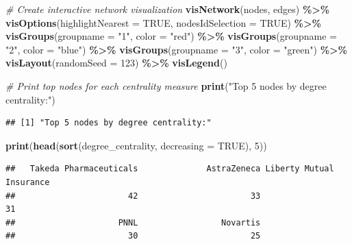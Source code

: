\documentclass[
]{article}
\newenvironment{Shaded}{\begin{snugshade}}{\end{snugshade}}
\newcommand{\AttributeTok}[1]{\textcolor[rgb]{0.13,0.29,0.53}{#1}}
\newcommand{\CommentTok}[1]{\textcolor[rgb]{0.56,0.35,0.01}{\textit{#1}}}
\newcommand{\ConstantTok}[1]{\textcolor[rgb]{0.56,0.35,0.01}{#1}}
\newcommand{\DecValTok}[1]{\textcolor[rgb]{0.00,0.00,0.81}{#1}}
\newcommand{\FunctionTok}[1]{\textcolor[rgb]{0.13,0.29,0.53}{\textbf{#1}}}
\newcommand{\NormalTok}[1]{#1}
\newcommand{\SpecialCharTok}[1]{\textcolor[rgb]{0.81,0.36,0.00}{\textbf{#1}}}
\newcommand{\StringTok}[1]{\textcolor[rgb]{0.31,0.60,0.02}{#1}}
\begin{document}
\begin{Shaded}
\begin{Highlighting}[]
\CommentTok{\# Create interactive network visualization}
\FunctionTok{visNetwork}\NormalTok{(nodes, edges) }\SpecialCharTok{\%\textgreater{}\%}
  \FunctionTok{visOptions}\NormalTok{(}\AttributeTok{highlightNearest =} \ConstantTok{TRUE}\NormalTok{, }\AttributeTok{nodesIdSelection =} \ConstantTok{TRUE}\NormalTok{) }\SpecialCharTok{\%\textgreater{}\%}
  \FunctionTok{visGroups}\NormalTok{(}\AttributeTok{groupname =} \StringTok{"1"}\NormalTok{, }\AttributeTok{color =} \StringTok{"red"}\NormalTok{) }\SpecialCharTok{\%\textgreater{}\%}
  \FunctionTok{visGroups}\NormalTok{(}\AttributeTok{groupname =} \StringTok{"2"}\NormalTok{, }\AttributeTok{color =} \StringTok{"blue"}\NormalTok{) }\SpecialCharTok{\%\textgreater{}\%}
  \FunctionTok{visGroups}\NormalTok{(}\AttributeTok{groupname =} \StringTok{"3"}\NormalTok{, }\AttributeTok{color =} \StringTok{"green"}\NormalTok{) }\SpecialCharTok{\%\textgreater{}\%}
  \FunctionTok{visLayout}\NormalTok{(}\AttributeTok{randomSeed =} \DecValTok{123}\NormalTok{) }\SpecialCharTok{\%\textgreater{}\%}
  \FunctionTok{visLegend}\NormalTok{()}
\end{Highlighting}
\end{Shaded}

\begin{Shaded}
\begin{Highlighting}[]
\CommentTok{\# Print top nodes for each centrality measure}
\FunctionTok{print}\NormalTok{(}\StringTok{"Top 5 nodes by degree centrality:"}\NormalTok{)}
\end{Highlighting}
\end{Shaded}

\begin{verbatim}
## [1] "Top 5 nodes by degree centrality:"
\end{verbatim}

\begin{Shaded}
\begin{Highlighting}[]
\FunctionTok{print}\NormalTok{(}\FunctionTok{head}\NormalTok{(}\FunctionTok{sort}\NormalTok{(degree\_centrality, }\AttributeTok{decreasing =} \ConstantTok{TRUE}\NormalTok{), }\DecValTok{5}\NormalTok{))}
\end{Highlighting}
\end{Shaded}

\begin{verbatim}
##   Takeda Pharmaceuticals              AstraZeneca Liberty Mutual Insurance 
##                       42                       33                       31 
##                     PNNL                 Novartis 
##                       30                       25
\end{verbatim}
\end{document}
